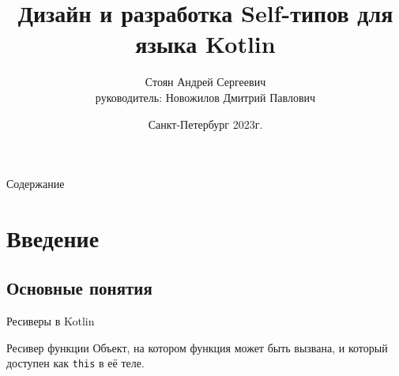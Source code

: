 \documentclass[handout,aspectratio=169,usenames,dvipsnames]{beamer}
\author[Андрей Стоян]{Стоян Андрей Сергеевич\\ {\footnotesize руководитель:} Новожилов Дмитрий Павлович}
\institute[ИТМО/SE]{Национальный исследовательский университет ИТМО\\Разработка программного обеспечения/Software engineering}
\title[Дизайн и разработка Self-типов для языка Kotlin]{Дизайн и разработка Self-типов для языка Kotlin}
\date{Санкт-Петербург 2023г.}
\begin{document}
\maketitle

\begin{frame}{Содержание}
    \tableofcontents
\end{frame}


\section{Введение}

\subsection{Основные понятия}

\begin{frame}[fragile]{Ресиверы в Kotlin}
    \begin{block}{Ресивер функции}
        Объект, на котором функция может быть вызвана, и который доступен как \texttt{this} в её теле.
    \end{block}


\end{frame}
\end{document}
